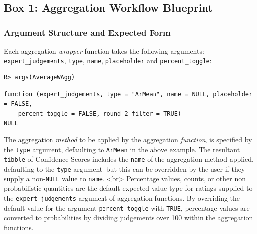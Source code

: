\documentclass[article]{jss}
\begin{document}
\begin{tcolorbox}[enhanced jigsaw, opacityback=0, arc=.35mm, left=2mm, breakable, bottomrule=.15mm, rightrule=.15mm, toprule=.15mm, leftrule=.75mm, colback=white, colframe=quarto-callout-color-frame]

\hypertarget{aggWorkflow}{}
\hypertarget{box-1-aggregation-workflow-blueprint}{%
\subsection*{Box 1: Aggregation Workflow
Blueprint}\label{box-1-aggregation-workflow-blueprint}}

\hypertarget{argument-structure-and-expected-form}{%
\subsubsection{Argument Structure and Expected
Form}\label{argument-structure-and-expected-form}}

Each aggregation \emph{wrapper} function takes the following arguments:
\texttt{expert\_judgements}, \texttt{type}, \texttt{name},
\texttt{placeholder} and \texttt{percent\_toggle}:

\begin{verbatim}
R> args(AverageWAgg)
\end{verbatim}

\begin{verbatim}
function (expert_judgements, type = "ArMean", name = NULL, placeholder = FALSE, 
    percent_toggle = FALSE, round_2_filter = TRUE) 
NULL
\end{verbatim}

The aggregation \emph{method} to be applied by the aggregation
\emph{function}, is specified by the \texttt{type} argument, defaulting
to \texttt{ArMean} in the above example. The resultant \texttt{tibble}
of Confidence Scores includes the \texttt{name} of the aggregation
method applied, defaulting to the \texttt{type} argument, but this can
be overridden by the user if they supply a non-\texttt{NULL} value to
\texttt{name}. \textless br\textgreater{} Percentage values, counts, or
other non probabilistic quantities are the default expected value type
for ratings supplied to the \texttt{expert\_judgements} argument of
aggregation functions. By overriding the default value for the argument
\texttt{percent\_toggle} with \texttt{TRUE}, percentage values are
converted to probabilities by dividing judgements over 100 within the
aggregation functions.


\end{tcolorbox}
\end{document}
